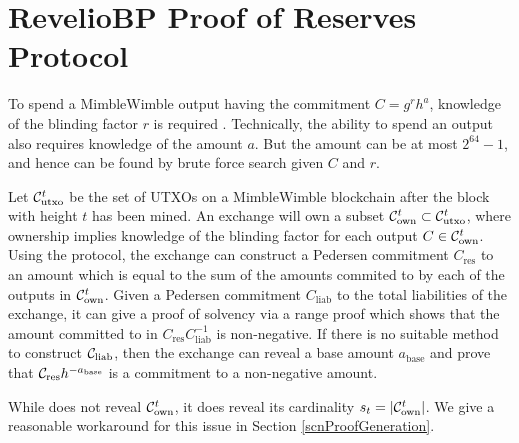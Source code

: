\vspace{-1pt}
\section{\textnormal{{\selectfont RevelioBP}} Proof of Reserves Protocol}
\label{scnSecurityPropertiesDefiniton}

To spend a MimbleWimble output having the commitment $C = g^r h^a$, knowledge of the blinding factor $r$ is required \cite{GrinDocOnGithub}.
Technically, the ability to spend an output also requires knowledge of the amount $a$. But the amount can be at most $2^{64}-1$, and hence can be found by brute force search given $C$ and $r$.

Let $\mathcal{C}_{\text{utxo}}^t$ be the set of UTXOs on a MimbleWimble blockchain after the block with height $t$ has been mined. An exchange will own a subset $\mathcal{C}_{\text{own}}^t \subset \mathcal{C}_{\text{utxo}}^t$, where ownership implies knowledge of the blinding factor for each output $C \in \mathcal{C}_{\text{own}}^t$.  Using the \RB protocol, the exchange can construct a Pedersen commitment $C_{\text{res}}$ to an amount which is equal to the sum of the amounts commited to by each of the outputs in $\mathcal{C}_{\text{own}}^t$.  Given a Pedersen commitment $C_{\text{liab}}$ to the total liabilities of the exchange, it can give a proof of solvency via a range proof which shows that the amount committed to in $C_{\text{res}}C_{\text{liab}}^{-1}$ is non-negative. If there is no suitable method to construct $\mathcal{C}_{\text{liab}}$, then the exchange can reveal a base amount $a_{\text{base}}$ and prove that $\mathcal{C}_{\text{res}}h^{-a_{\text{base}}}$ is a commitment to a non-negative amount.

While \RPlus does not reveal $\mathcal{C}_{\text{own}}^t$, it does reveal its cardinality $s_t = \left| \mathcal{C}_{\text{own}}^t \right|$.
We give a reasonable workaround for this issue in Section \ref{scnProofGeneration}.



